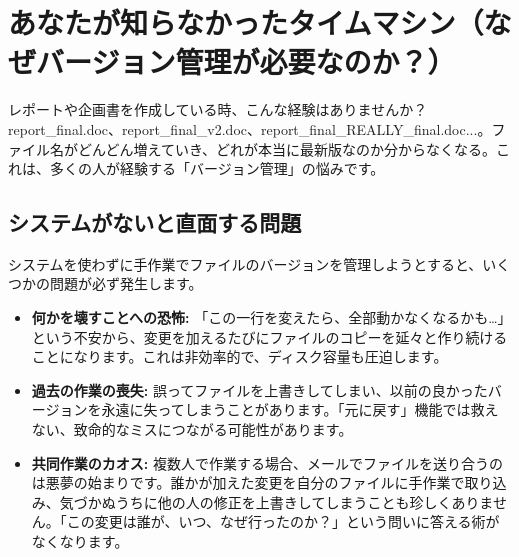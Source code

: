 \documentclass{ltjsarticle}
\begin{document}
\section{あなたが知らなかったタイムマシン（なぜバージョン管理が必要なのか？）}
レポートや企画書を作成している時、こんな経験はありませんか？ report_final.doc、report_final_v2.doc、report_final_REALLY_final.doc...。ファイル名がどんどん増えていき、どれが本当に最新版なのか分からなくなる。これは、多くの人が経験する「バージョン管理」の悩みです。

\subsection{システムがないと直面する問題}
システムを使わずに手作業でファイルのバージョンを管理しようとすると、いくつかの問題が必ず発生します。
\begin{itemize}
    \item \textbf{何かを壊すことへの恐怖:} 「この一行を変えたら、全部動かなくなるかも…」という不安から、変更を加えるたびにファイルのコピーを延々と作り続けることになります。これは非効率的で、ディスク容量も圧迫します。
    \item \textbf{過去の作業の喪失:} 誤ってファイルを上書きしてしまい、以前の良かったバージョンを永遠に失ってしまうことがあります。「元に戻す」機能では救えない、致命的なミスにつながる可能性があります。
    \item \textbf{共同作業のカオス:} 複数人で作業する場合、メールでファイルを送り合うのは悪夢の始まりです。誰かが加えた変更を自分のファイルに手作業で取り込み、気づかぬうちに他の人の修正を上書きしてしまうことも珍しくありません。「この変更は誰が、いつ、なぜ行ったのか？」という問いに答える術がなくなります。
\end{itemize}
\end{document}
